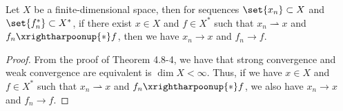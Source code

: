 \documentclass[12pt,letterpaper,twoside]{hmcpset}
\begin{document}
\begin{problem}[7]
  Let $X$ be a finite-dimensional space, then for sequences $\set{x_{n}} \subset X$ and $\set{f_{n}^{*}} \subset X^{*}$, if there exist $x \in X$ and $f \in X^{*}$ such that $x_{n} \rightharpoonup x$ and $f_{n} \xrightharpoonup{*} f$, then we have $x_{n} \to x$ and $f_{n} \to f$.
\end{problem}

\begin{solution}
  \begin{proof}
    From the proof of Theorem 4.8-4, we have that strong convergence
    and weak convergence are equivalent is $\dim X < \infty$. Thus, if we have $x \in X$ and $f \in X^{*}$ such that $x_{n} \rightharpoonup x$ and $f_{n} \xrightharpoonup{*} f$, we also have $x_{n} \to x$ and $f_{n} \to f$.
  \end{proof}
\end{solution}
\end{document}
